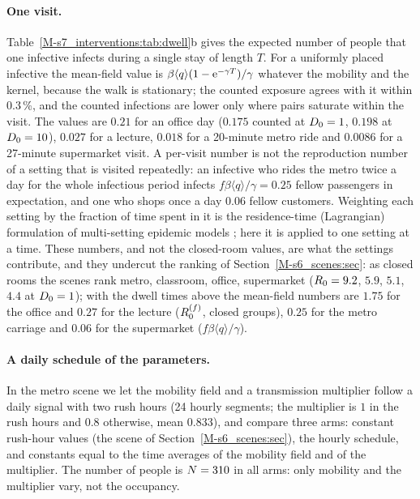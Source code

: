 \paragraph{One visit.} Table~\ref{M-s7_interventions:tab:dwell}b gives the expected number of people that one
infective infects during a single stay of length $T$. For a uniformly placed infective the mean-field value is
$\beta\langle q\rangle(1-\mathrm{e}^{-\gamma T})/\gamma$ whatever the mobility and the kernel, because the walk is
stationary; the counted exposure agrees with it within 0.3\,\%, and the counted infections are lower only
where pairs saturate within the visit. The values are $0.21$ for an office day ($0.175$ counted at $D_0=1$,
$0.198$ at $D_0=10$), $0.027$ for a lecture, $0.018$ for a 20-minute metro ride and $0.0086$ for a 27-minute
supermarket visit.
A per-visit number is not the reproduction number of a setting that is visited repeatedly: an infective who
rides the metro twice a day for the whole infectious period infects $f\beta\langle q\rangle/\gamma=0.25$
fellow passengers in expectation, and one who shops once a day $0.06$ fellow customers. Weighting each
setting by the fraction of time spent in it is the residence-time (Lagrangian) formulation of multi-setting
epidemic models \citep{bichara2015sis}; here it is applied to one setting at a time. These numbers, and
not the closed-room values, are what the settings contribute, and they undercut the ranking of
Section~\ref{M-s6_scenes:sec}: as closed rooms the scenes rank metro, classroom, office, supermarket
($R_0=9.2$, $5.9$, $5.1$, $4.4$ at $D_0=1$); with the dwell times above the mean-field numbers are $1.75$ for
the office and $0.27$ for the lecture ($R_0^{(f)}$, closed groups), $0.25$ for the metro carriage and $0.06$
for the supermarket ($f\beta\langle q\rangle/\gamma$).

\paragraph{A daily schedule of the parameters.} In the metro scene we let the mobility field and a transmission
multiplier follow a daily signal with two rush hours (24 hourly segments; the multiplier is $1$ in the rush
hours and $0.8$ otherwise, mean $0.833$), and compare three arms: constant rush-hour values (the scene of
Section~\ref{M-s6_scenes:sec}), the hourly schedule, and constants equal to the time averages of the mobility
field and of the multiplier. The number of people is $N=310$ in all arms: only mobility and the multiplier
vary, not the occupancy.

